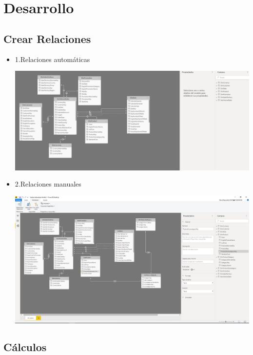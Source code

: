 \section{Desarrollo } 

\subsection {Crear Relaciones}
\begin{itemize}
 \item 1.Relaciones automáticas

	\begin{center}
	\includegraphics[width=18cm]{./Imagenes/Imagen1}
	\end{center}	


 \item 2.Relaciones manuales

	\begin{center}
	\includegraphics[width=18cm]{./Imagenes/Imagen2}
	\end{center}	

\end{itemize}

\subsection {Cálculos}

